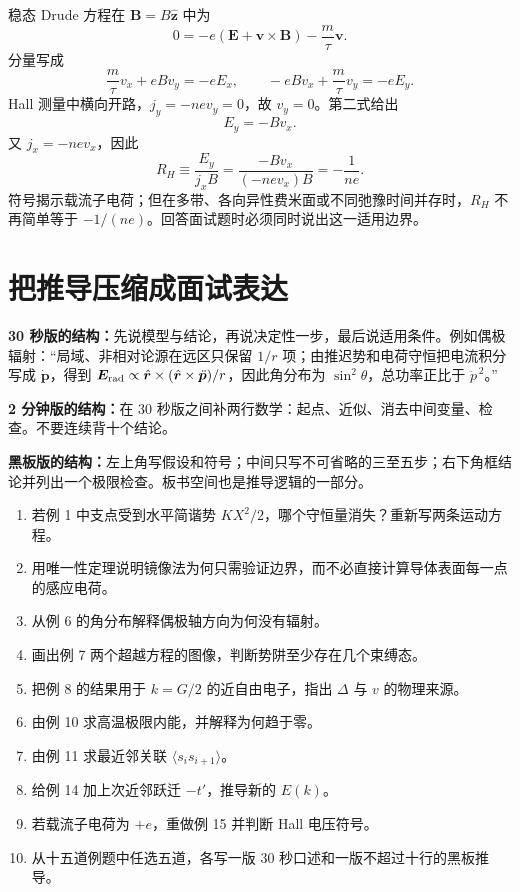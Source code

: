 \begin{examplebox}[title=例 15：抛物能带的 Hall 系数]
稳态 Drude 方程在 $\bm B=B\hat{\bm z}$ 中为
\[
0=-e(\bm E+\bm v\times\bm B)-\frac m\tau\bm v.
\]
分量写成
\[
\frac m\tau v_x+eBv_y=-eE_x,\qquad
-eBv_x+\frac m\tau v_y=-eE_y.
\]
Hall 测量中横向开路，$j_y=-nev_y=0$，故 $v_y=0$。第二式给出
\[
E_y=-Bv_x.
\]
又 $j_x=-nev_x$，因此
\[
R_H\equiv\frac{E_y}{j_xB}
=\frac{-Bv_x}{(-nev_x)B}
=-\frac1{ne}.
\]
符号揭示载流子电荷；但在多带、各向异性费米面或不同弛豫时间并存时，$R_H$ 不再简单等于 $-1/(ne)$。回答面试题时必须同时说出这一适用边界。
\end{examplebox}

\section{把推导压缩成面试表达}

\begin{interviewbox}
\textbf{30 秒版的结构：}先说模型与结论，再说决定性一步，最后说适用条件。例如偶极辐射：“局域、非相对论源在远区只保留 $1/r$ 项；由推迟势和电荷守恒把电流积分写成 $\dot{\bm p}$，得到 $\bm E_{\rm rad}\propto\hat{\bm r}\times(\hat{\bm r}\times\ddot{\bm p})/r$，因此角分布为 $\sin^2\theta$，总功率正比于 $\ddot p^{\,2}$。”

\textbf{2 分钟版的结构：}在 30 秒版之间补两行数学：起点、近似、消去中间变量、检查。不要连续背十个结论。

\textbf{黑板版的结构：}左上角写假设和符号；中间只写不可省略的三至五步；右下角框结论并列出一个极限检查。板书空间也是推导逻辑的一部分。
\end{interviewbox}

\begin{selftestbox}
\begin{enumerate}
  \item 若例 1 中支点受到水平简谐势 $KX^2/2$，哪个守恒量消失？重新写两条运动方程。
  \item 用唯一性定理说明镜像法为何只需验证边界，而不必直接计算导体表面每一点的感应电荷。
  \item 从例 6 的角分布解释偶极轴方向为何没有辐射。
  \item 画出例 7 两个超越方程的图像，判断势阱至少存在几个束缚态。
  \item 把例 8 的结果用于 $k=G/2$ 的近自由电子，指出 $\Delta$ 与 $v$ 的物理来源。
  \item 由例 10 求高温极限内能，并解释为何趋于零。
  \item 由例 11 求最近邻关联 $\langle s_is_{i+1}\rangle$。
  \item 给例 14 加上次近邻跃迁 $-t'$，推导新的 $E(k)$。
  \item 若载流子电荷为 $+e$，重做例 15 并判断 Hall 电压符号。
  \item 从十五道例题中任选五道，各写一版 30 秒口述和一版不超过十行的黑板推导。
\end{enumerate}
\end{selftestbox}

